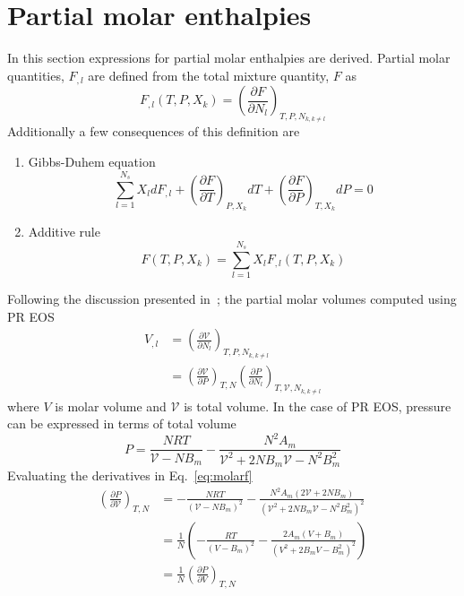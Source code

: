 \documentclass[11pt]{article}
\begin{document}
     \section{Partial molar enthalpies}
     \label{sec:PartialEnthalpies}
     In this section expressions for partial molar enthalpies are derived. Partial molar quantities, $F_{,l}$ are defined from the total mixture quantity, $F$ as 
     \begin{equation}
     F_{,l}\left(T,P, X_{k}\right) = \left( \frac{\partial F}{\partial N_{l}}\right)_{T,P,N_{k,k\neq l}}
     \end{equation}
     Additionally a few consequences of this definition are 
     \begin{enumerate}
     \item Gibbs-Duhem equation
     \begin{equation}
     \sum_{l=1}^{N_{s}} X_{l} dF_{,l} + \left(\frac{\partial F}{\partial T} \right)_{P,X_{k}} dT + \left(\frac{\partial F}{\partial P} \right)_{T,X_{k}} dP = 0
     \end{equation}
     \item Additive rule
     \begin{equation}
     F\left(T,P,X_{k} \right) = \sum_{l=1}^{N_{s}} X_{l} F_{,l}\left(T,P,X_{k}\right)
     \end{equation}
     \end{enumerate}
     Following the discussion presented in~\cite{masquelet2013large}; the partial molar volumes computed using PR EOS
     \begin{align}
     V_{,l} &= \left(\frac{\partial \mathcal{V}}{\partial N_{l}} \right)_{T,P,N_{k,k\neq l}} \\
       &= \left(\frac{\partial \mathcal{V}}{\partial P} \right)_{T,N} \left(\frac{\partial P}{\partial N_{l}} \right)_{T,\mathcal{V},N_{k,k\neq l}}
       \label{eq:molarf}
     \end{align}
     where $V$ is molar volume and $\mathcal{V}$ is total volume. In the case of PR EOS, pressure can be expressed in terms of total volume
     \begin{equation}
     P = \frac{N R T}{\mathcal{V} - N B_{m}} - \frac{N^{2}A_{m}}{\mathcal{V}^{2}+2NB_{m}\mathcal{V}-N^{2}B_{m}^2}
     \end{equation}
     Evaluating the derivatives in Eq.~\ref{eq:molarf}
     \begin{align}
     \left(\frac{\partial P}{\partial \mathcal{V}}\right)_{T,N} &= -\frac{N R T}{\left(\mathcal{V}-NB_{m}\right)^{2}} - \frac{N^2 A_m \left(2\mathcal{V}+2N B_m\right)}{\left(\mathcal{V}^{2}+2NB_m\mathcal{V} - N^2B_m^2\right)^2} \\
&=\frac{1}{N} \left(-\frac{R T}{\left(V-B_{m}\right)^{2}} - \frac{2A_m \left(V+B_m\right)}{\left(V^{2}+2B_m V-B_m^2\right)^2}\right) \\
& = \frac{1}{N}\left(\frac{\partial P}{\partial V}\right)_{T,N}
     \end{align}
\end{document}
